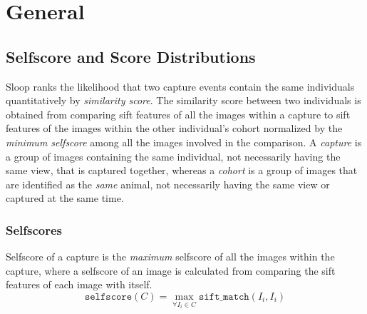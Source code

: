 \section{General}

\subsection{Selfscore and Score Distributions}

Sloop ranks the likelihood that two capture events contain the same individuals
quantitatively by \emph{similarity score}. The similarity score between two
individuals is obtained from comparing sift features of all the images within a
capture to sift features of the images within the other individual's cohort
normalized by the \emph{minimum selfscore} among all the images involved in the
comparison. A \emph{capture} is a group of images containing the same
individual, not necessarily having the same view, that is captured together,
whereas a \emph{cohort} is a group of images that are identified as the
\emph{same} animal, not necessarily having the same view or captured at the
same time.

\subsubsection{Selfscores}

Selfscore of a capture is the \emph{maximum} selfscore of all the images within
the capture, where a selfscore of an image is calculated from comparing the
sift features of each image with itself.  $$\texttt{selfscore}(C) =
\max_{\forall I_i \in C} \texttt{sift\_match}(I_i, I_i)$$ 

